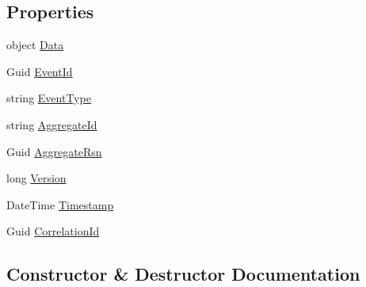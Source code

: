 \subsection*{Properties}
\begin{DoxyCompactItemize}
\item 
object \hyperlink{classCqrs_1_1Events_1_1EventData_ae001b9d06977e5fd407744459fad2da5_ae001b9d06977e5fd407744459fad2da5}{Data}
\item 
Guid \hyperlink{classCqrs_1_1Events_1_1EventData_a020c856c1e3a97d8783ccf0ba86c6f59_a020c856c1e3a97d8783ccf0ba86c6f59}{Event\+Id}
\item 
string \hyperlink{classCqrs_1_1Events_1_1EventData_a11b4f2ea845000dea4148a94d4c6ba93_a11b4f2ea845000dea4148a94d4c6ba93}{Event\+Type}
\item 
string \hyperlink{classCqrs_1_1Events_1_1EventData_a0079e7f2307d3fc54063317edb71ffc2_a0079e7f2307d3fc54063317edb71ffc2}{Aggregate\+Id}
\item 
Guid \hyperlink{classCqrs_1_1Events_1_1EventData_a562ea218ea8f517a980452097239c774_a562ea218ea8f517a980452097239c774}{Aggregate\+Rsn}
\item 
long \hyperlink{classCqrs_1_1Events_1_1EventData_a6abb7d888f3bba44c081587aacab0181_a6abb7d888f3bba44c081587aacab0181}{Version}
\item 
Date\+Time \hyperlink{classCqrs_1_1Events_1_1EventData_ace1a7435af5c3fd14cfb2dc095d12a85_ace1a7435af5c3fd14cfb2dc095d12a85}{Timestamp}
\item 
Guid \hyperlink{classCqrs_1_1Events_1_1EventData_a8d854d86e700a99f7cede8cda598d271_a8d854d86e700a99f7cede8cda598d271}{Correlation\+Id}
\end{DoxyCompactItemize}


\subsection{Constructor \& Destructor Documentation}
\mbox{\label{classCqrs_1_1Events_1_1EventData_a0387ea22e5cdc085caf113a82f5ace18_a0387ea22e5cdc085caf113a82f5ace18}} 
